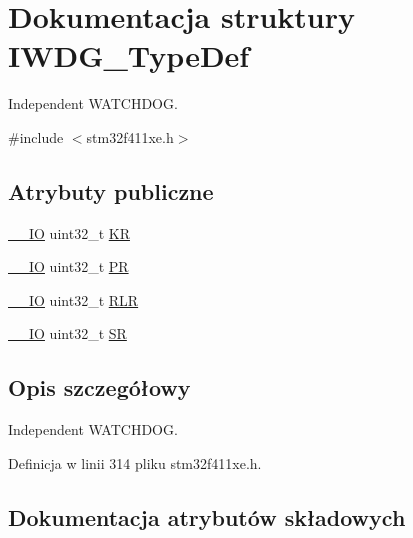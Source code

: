 \hypertarget{struct_i_w_d_g___type_def}{}\section{Dokumentacja struktury I\+W\+D\+G\+\_\+\+Type\+Def}
\label{struct_i_w_d_g___type_def}


Independent W\+A\+T\+C\+H\+D\+OG.  




{\ttfamily \#include $<$stm32f411xe.\+h$>$}

\subsection*{Atrybuty publiczne}
\begin{DoxyCompactItemize}
\item 
\hyperlink{core__sc300_8h_aec43007d9998a0a0e01faede4133d6be}{\+\_\+\+\_\+\+IO} uint32\+\_\+t \hyperlink{struct_i_w_d_g___type_def_a63089aaa5f4ad34ee2677ebcdee49cd9}{KR}
\item 
\hyperlink{core__sc300_8h_aec43007d9998a0a0e01faede4133d6be}{\+\_\+\+\_\+\+IO} uint32\+\_\+t \hyperlink{struct_i_w_d_g___type_def_a5f2717885ff171e686e0347af9e6b68d}{PR}
\item 
\hyperlink{core__sc300_8h_aec43007d9998a0a0e01faede4133d6be}{\+\_\+\+\_\+\+IO} uint32\+\_\+t \hyperlink{struct_i_w_d_g___type_def_aa3703eaa40e447dcacc69c0827595532}{R\+LR}
\item 
\hyperlink{core__sc300_8h_aec43007d9998a0a0e01faede4133d6be}{\+\_\+\+\_\+\+IO} uint32\+\_\+t \hyperlink{struct_i_w_d_g___type_def_a9bbfbe921f2acfaf58251849bd0a511c}{SR}
\end{DoxyCompactItemize}


\subsection{Opis szczegółowy}
Independent W\+A\+T\+C\+H\+D\+OG. 

Definicja w linii 314 pliku stm32f411xe.\+h.



\subsection{Dokumentacja atrybutów składowych}
\mbox{\label{struct_i_w_d_g___type_def_a63089aaa5f4ad34ee2677ebcdee49cd9}} 
